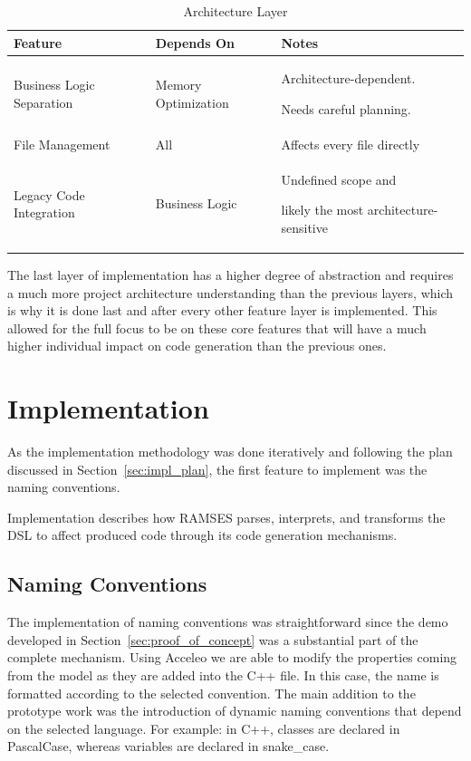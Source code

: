 \bgroup
{}
\begin{xltabular}{\textwidth}{X X X}
\caption{Architecture Layer}
\label{tab:arch_layer}\\
\toprule
{}%
Feature & Depends On & Notes \\
\midrule
Business Logic Separation & Memory Optimization & Architecture-dependent.\par Needs careful planning. \\
File Management & All & Affects every file directly \\
Legacy Code Integration & Business Logic & Undefined scope and\par likely the most architecture-sensitive \\
\bottomrule
\end{xltabular}

The last layer of implementation has a higher degree of abstraction and requires a much more project architecture understanding than the previous layers, which is why it is done last and after every other feature layer is implemented. This allowed for the full focus to be on these core features that will have a much higher individual impact on code generation than the previous ones.

\section{Implementation}
\label{sec:implementation}


As the implementation methodology was done iteratively and following the plan discussed in Section~\ref{sec:impl_plan}, the first feature to implement was the naming conventions.


\begin{tcolorbox}[colback=green!5, colframe=green!40!black] Implementation describes how \gls{RAMSES} parses, interprets, and transforms the \gls{DSL} to affect produced code through its code generation mechanisms. \end{tcolorbox}


\subsection{Naming Conventions}
\label{sec:impl_name_conv}

The implementation of naming conventions was straightforward since the demo developed in Section~\ref{sec:proof_of_concept} was a substantial part of the complete mechanism. Using Acceleo we are able to modify the properties coming from the model as they are added into the C++ file. In this case, the name is formatted according to the selected convention. The main addition to the prototype work was the introduction of dynamic naming conventions that depend on the selected language. For example: in C++, classes are declared in PascalCase, whereas variables are declared in snake\_case.


